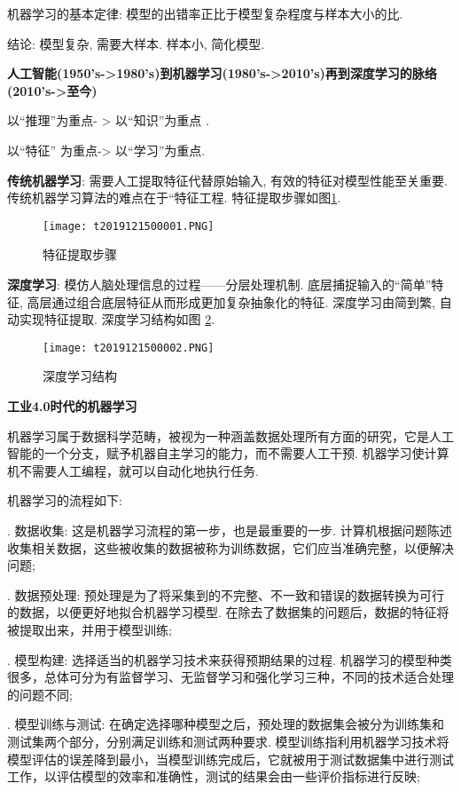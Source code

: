 机器学习的基本定律: 模型的出错率正比于模型复杂程度与样本大小的比.

结论:  模型复杂, 需要大样本. 样本小, 简化模型.

\textbf{人工智能(1950's->1980's)到机器学习(1980's->2010's)再到深度学习的脉络(2010's->至今)}
\begin{center}
以“推理”为重点- > 以“知识”为重点 .

以“特征” 为重点-> 以“学习”为重点.
\end{center}

\textbf{传统机器学习}:  需要人工提取特征代替原始输入, 有效的特征对模型性能至关重要. 传统机器学习算法的难点在于“特征工程. 特征提取步骤如图\ref{AI32fig2019121501}.
\begin{figure}[H]
\centering
\texttt{[image: t2019121500001.PNG]}
\caption{特征提取步骤}
\label{AI32fig2019121501}
\end{figure}

\textbf{深度学习}: 模仿人脑处理信息的过程——分层处理机制. 底层捕捉输入的“简单”特征, 高层通过组合底层特征从而形成更加复杂抽象化的特征. 深度学习由简到繁, 自动实现特征提取. 深度学习结构如图 \ref{AI32fig2019121502}.
\begin{figure}[H]
\centering
\texttt{[image: t2019121500002.PNG]}
\caption{深度学习结构}
\label{AI32fig2019121502}
\end{figure}
\textbf{工业4.0时代的机器学习}

机器学习属于数据科学范畴，被视为一种涵盖数据处理所有方面的研究，它是人工智能的一个分支，赋予机器自主学习的能力，而不需要人工干预. 机器学习使计算机不需要人工编程，就可以自动化地执行任务.

机器学习的流程如下:

. 数据收集: 这是机器学习流程的第一步，也是最重要的一步. 计算机根据问题陈述收集相关数据，这些被收集的数据被称为训练数据，它们应当准确完整，以便解决问题;

. 数据预处理: 预处理是为了将采集到的不完整、不一致和错误的数据转换为可行的数据，以便更好地拟合机器学习模型. 在除去了数据集的问题后，数据的特征将被提取出来，并用于模型训练;

. 模型构建: 选择适当的机器学习技术来获得预期结果的过程. 机器学习的模型种类很多，总体可分为有监督学习、无监督学习和强化学习三种，不同的技术适合处理的问题不同;

. 模型训练与测试: 在确定选择哪种模型之后，预处理的数据集会被分为训练集和测试集两个部分，分别满足训练和测试两种要求. 模型训练指利用机器学习技术将模型评估的误差降到最小，当模型训练完成后，它就被用于测试数据集中进行测试工作，以评估模型的效率和准确性，测试的结果会由一些评价指标进行反映;

